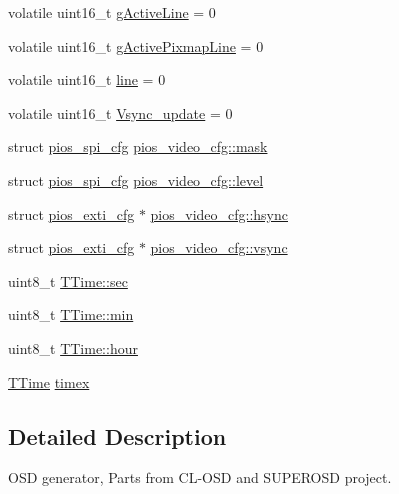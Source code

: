 \begin{DoxyCompactItemize}
\item 
volatile uint16\-\_\-t \hyperlink{group___p_i_o_s___v_i_d_e_o_ga2b82b203be6721e41653a0b4c07bfd82}{g\-Active\-Line} = 0
\item 
volatile uint16\-\_\-t \hyperlink{group___p_i_o_s___v_i_d_e_o_ga4e778b3bd5c9d692c381957e741aa4a3}{g\-Active\-Pixmap\-Line} = 0
\item 
volatile uint16\-\_\-t \hyperlink{group___p_i_o_s___v_i_d_e_o_ga308d53a9c395c298132110da98adb7c7}{line} = 0
\item 
volatile uint16\-\_\-t \hyperlink{group___p_i_o_s___v_i_d_e_o_ga650b4db295bf40320fafbfce5954a39e}{\-Vsync\-\_\-update} = 0
\item 
struct \hyperlink{structpios__spi__cfg}{pios\-\_\-spi\-\_\-cfg} \hyperlink{group___p_i_o_s___v_i_d_e_o_gac6699e31fbc588e69db444000ba7d44d}{pios\-\_\-video\-\_\-cfg\-::mask}
\item 
struct \hyperlink{structpios__spi__cfg}{pios\-\_\-spi\-\_\-cfg} \hyperlink{group___p_i_o_s___v_i_d_e_o_gab3de6ddfa1d478f8062c895cad5d4793}{pios\-\_\-video\-\_\-cfg\-::level}
\item 
struct \hyperlink{structpios__exti__cfg}{pios\-\_\-exti\-\_\-cfg} $\ast$ \hyperlink{group___p_i_o_s___v_i_d_e_o_ga01589e94ad18d5c8d12f72778539f8aa}{pios\-\_\-video\-\_\-cfg\-::hsync}
\item 
struct \hyperlink{structpios__exti__cfg}{pios\-\_\-exti\-\_\-cfg} $\ast$ \hyperlink{group___p_i_o_s___v_i_d_e_o_ga489c20025b1facf5435c66ff616e1cd9}{pios\-\_\-video\-\_\-cfg\-::vsync}
\item 
uint8\-\_\-t \hyperlink{group___p_i_o_s___v_i_d_e_o_gaa6288943af354a6cb143f2ad677cfece}{\-T\-Time\-::sec}
\item 
uint8\-\_\-t \hyperlink{group___p_i_o_s___v_i_d_e_o_gadb9b0440ee5ef05786949736913ce45c}{\-T\-Time\-::min}
\item 
uint8\-\_\-t \hyperlink{group___p_i_o_s___v_i_d_e_o_gae7afd210e593b007611ac237bd32d30d}{\-T\-Time\-::hour}
\item 
\hyperlink{struct_t_time}{\-T\-Time} \hyperlink{group___p_i_o_s___v_i_d_e_o_gac6e460448d29f05aad59dc67c3035057}{timex}
\end{DoxyCompactItemize}


\subsection{\-Detailed \-Description}
\-O\-S\-D generator, \-Parts from \-C\-L-\/\-O\-S\-D and \-S\-U\-P\-E\-R\-O\-S\-D project. 

